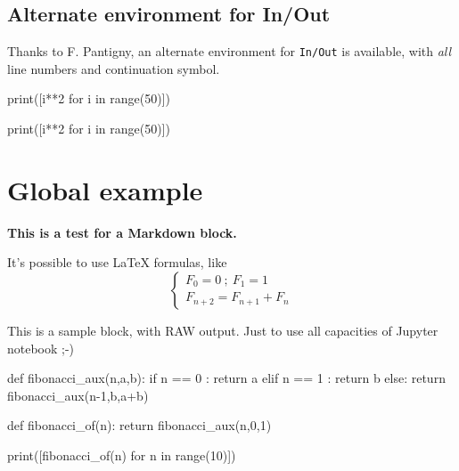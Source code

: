 \documentclass[a4paper,11pt]{article}
\begin{document}
\subsection{Alternate environment for In/Out}

Thanks to F. Pantigny, an alternate environment for \texttt{In/Out} is available, with \textit{all} line numbers and continuation symbol.

\begin{codehigh}
\begin{NotebookPitonAllNum}{0.66\linewidth}
print([i**2 for i in range(50)])
\end{NotebookPitonAllNum}
\end{codehigh}

\begin{NotebookPitonAllNum}{0.66\linewidth}
print([i**2 for i in range(50)])
\end{NotebookPitonAllNum}

\pagebreak

\section{Global example}

\setcounter{JupyterIn}{0}

\begin{NotebookPitonMarkdown}{\linewidth}
{\Large\bfseries This is a test for a \textsf{Markdown} block.}

It's possible to use \LaTeX{} formulas, like %
\[
\left\lbrace\begin{array}{l}
F_0 = 0 \: ; \: F_1 = 1 \\
F_{n+2} = F_{n+1} + F_n
\end{array}\right.
\]
\end{NotebookPitonMarkdown}

\begin{NotebookPitonRaw}{\linewidth}
This is a sample block, with RAW output.
Just to use all capacities of Jupyter notebook ;-)
\end{NotebookPitonRaw}

\begin{NotebookPitonInOut}{\linewidth}
def fibonacci_aux(n,a,b):
	if n == 0 :
		return a
	elif n == 1 :
		return b
	else:
		return fibonacci_aux(n-1,b,a+b)

def fibonacci_of(n):
	return fibonacci_aux(n,0,1)

print([fibonacci_of(n) for n in range(10)])
\end{NotebookPitonInOut}
\end{document}
